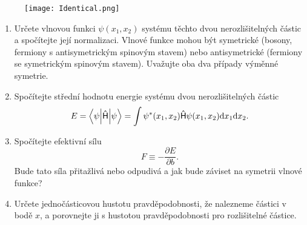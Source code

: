         \begin{figure}[htbp!]
            \centering
            \texttt{[image: Identical.png]}
        \end{figure}

        \begin{enumerate}
            \item 
                Určete vlnovou funkci $\psi(x_{1},x_{2})$ systému těchto dvou nerozlišitelných částic a spočítejte její normalizaci.
                Vlnové funkce mohou být symetrické (bosony, fermiony s antisymetrickým spinovým stavem) nebo antisymetrické (fermiony se symetrickým spinovým stavem). 
                Uvažujte oba dva případy výměnné symetrie.
            
            \item Spočítejte střední hodnotu energie systému dvou nerozlišitelných částic
                \begin{equation}
                    E=\left\langle{\psi}\middle|{\mathsf{\hat{H}}}\middle|{\psi}\right\rangle=\int\psi^{*}(x_{1},x_{2})\mathsf{\hat{H}}\psi(x_{1},x_{2})\mathrm{d} x_{1}\mathrm{d} x_{2}.
                \end{equation}

            \item Spočítejte efektivní sílu
                \begin{equation}
                    F\equiv-\frac{\partial E}{\partial b}.
                \end{equation}
                Bude tato síla přitažlivá nebo odpudivá a jak bude záviset na symetrii vlnové funkce?

            \item Určete jednočásticovou hustotu pravděpodobnosti, že nalezneme částici v bodě $x$, a porovnejte ji s hustotou pravděpodobnosti pro rozlišitelné částice.
        \end{enumerate}
